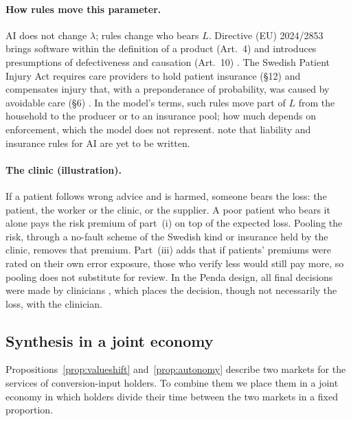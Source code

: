 \documentclass[12pt]{article}
\theoremstyle{remark}
\begin{document}
\paragraph{How rules move this parameter.} AI does not change $\lambda$; rules change who bears $L$. Directive (EU) 2024/2853 brings software within the definition of a product (Art.~4) and introduces presumptions of defectiveness and causation (Art.~10) \citep{eu2024pld}. The Swedish Patient Injury Act requires care providers to hold patient insurance (§12) and compensates injury that, with a preponderance of probability, was caused by avoidable care (§6) \citep{sweden1996patient}. In the model's terms, such rules move part of $L$ from the household to the producer or to an insurance pool; how much depends on enforcement, which the model does not represent. \citet[p.~318]{brynjolfsson2026hayek} note that liability and insurance rules for AI are yet to be written.

\paragraph{The clinic (illustration).} If a patient follows wrong advice and is harmed, someone bears the loss: the patient, the worker or the clinic, or the supplier. A poor patient who bears it alone pays the risk premium of part~(i) on top of the expected loss. Pooling the risk, through a no-fault scheme of the Swedish kind or insurance held by the clinic, removes that premium. Part~(iii) adds that if patients' premiums were rated on their own error exposure, those who verify less would still pay more, so pooling does not substitute for review. In the Penda design, all final decisions were made by clinicians \citep[p.~7]{korom2025penda}, which places the decision, though not necessarily the loss, with the clinician.

\subsection{Synthesis in a joint economy}\label{sec:synthesis}

Propositions~\ref{prop:valueshift} and~\ref{prop:autonomy} describe two markets for the services of conversion-input holders. To combine them we place them in a joint economy in which holders divide their time between the two markets in a fixed proportion.
\end{document}
